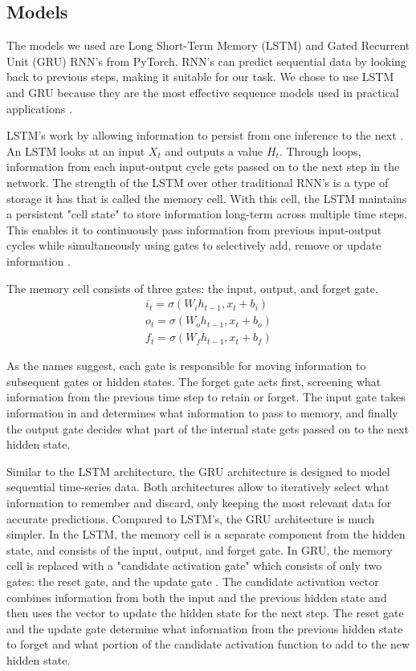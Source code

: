 \documentclass[conference]{IEEEtran}
\begin{document}
\subsection{Models}
The models we used are Long Short-Term Memory (LSTM) and Gated Recurrent Unit (GRU) RNN's from PyTorch. RNN's can predict sequential data by looking back to previous steps, making it suitable for our task. We chose to use LSTM and GRU because they are the most effective sequence models used in practical applications \cite{Goodfellow2016}.

LSTM's work by allowing information to persist from one inference to the next \cite{Noble2025}. An LSTM looks at an input $X_t$ and outputs a value $H_t$. Through loops, information from each input-output cycle gets passed on to the next step in the network. The strength of the LSTM over other traditional RNN's is a type of storage it has that is called the memory cell. With this cell, the LSTM maintains a persistent "cell state" to store information long-term across multiple time steps. This enables it to continuously pass information from previous input-output cycles while simultaneously using gates to selectively add, remove or update information \cite{Noble2025}.

The memory cell consists of three gates: the input, output, and forget gate.
\begin{equation}
	\begin{aligned}
		i_t = \sigma(W_i h_{t-1},x_t+b_i) \\
		o_t = \sigma(W_o h_{t-1},x_t+b_o) \\
		f_t = \sigma(W_f h_{t-1},x_t+b_f)
	\end{aligned}
\end{equation}

As the names suggest, each gate is responsible for moving information to subsequent gates or hidden states. The forget gate acts first, screening what information from the previous time step to retain or forget. The input gate takes information in and determines what information to pass to memory, and finally the output gate decides what part of the internal state gets passed on to the next hidden state.

Similar to the LSTM architecture, the GRU architecture is designed to model sequential time-series data. Both architectures allow to iteratively select what information to remember and discard, only keeping the most relevant data for accurate predictions. Compared to LSTM's, the GRU architecture is much simpler. In the LSTM, the memory cell is a separate component from the hidden state, and consists of the input, output, and forget gate. In GRU, the memory cell is replaced with a "candidate activation gate" which consists of only two gates: the reset gate, and the update gate \cite{Nama2023}. The candidate activation vector combines information from both the input and the previous hidden state and then uses the vector to update the hidden state for the next step. The reset gate and the update gate determine what information from the previous hidden state to forget and what portion of the candidate activation function to add to the new hidden state.
\end{document}
